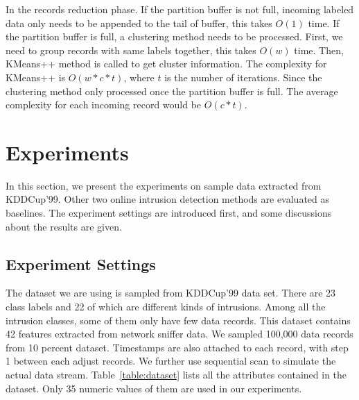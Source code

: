 \documentclass[runningheads]{llncs}
\begin{document}
	In the records reduction phase. If the partition buffer is not full, incoming labeled data only needs to be appended to the tail of buffer, this takes $O(1)$ time. If the partition buffer is full, a clustering method needs to be processed. First, we need to group records with same labels together, this takes $O(w)$ time. Then, KMeans++ method is called to get cluster information. The complexity for KMeans++ is $O(w*c*t)$, where $t$ is the number of iterations. Since the clustering method only processed once the partition buffer is full. The average complexity for each incoming record would be $O(c*t)$.
	
	\section{Experiments} \label{Experiments}
	In this section, we present the experiments on sample data extracted from KDDCup'99. Other two online intrusion detection methods are evaluated as baselines. The experiment settings are introduced first, and some discussions about the results are given.
	
	\subsection{Experiment Settings}
	
	The dataset we are using is sampled from KDDCup'99 data set. There are 23 class labels and 22 of which are different kinds of intrusions. Among all the intrusion classes, some of them only have few data records. This dataset contains 42 features extracted from network sniffer data. We sampled 100,000 data records from 10 percent dataset. Timestamps are also attached to each record, with step 1 between each adjust records. We further use sequential scan to simulate the actual data stream. Table~\ref{table:dataset} lists all the attributes contained in the dataset. Only 35 numeric values of them are used in our experiments.
	
\end{document}
